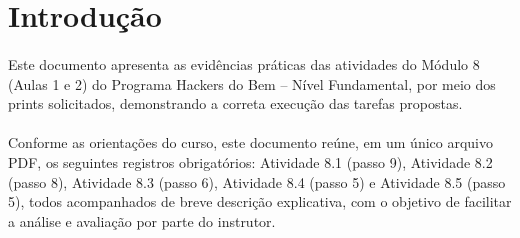 \section{Introdução}

\paragraph{}
Este documento apresenta as evidências práticas das atividades do Módulo 8
(Aulas 1 e 2) do Programa Hackers do Bem -- Nível Fundamental, por meio dos
prints solicitados, demonstrando a correta execução das tarefas propostas.

\paragraph{}
Conforme as orientações do curso, este documento reúne, em um único arquivo
PDF, os seguintes registros obrigatórios: Atividade 8.1 (passo 9), Atividade
8.2 (passo 8), Atividade 8.3 (passo 6), Atividade 8.4 (passo 5) e Atividade 8.5
(passo 5), todos acompanhados de breve descrição explicativa, com o objetivo de
facilitar a análise e avaliação por parte do instrutor.
